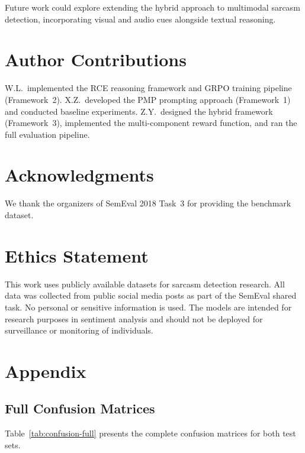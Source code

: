 \documentclass{article}
\begin{document}
Future work could explore extending the hybrid approach to multimodal sarcasm detection, incorporating visual and audio cues alongside textual reasoning.


\section*{Author Contributions}
W.L.\ implemented the RCE reasoning framework and GRPO training pipeline (Framework~2). X.Z.\ developed the PMP prompting approach (Framework~1) and conducted baseline experiments. Z.Y.\ designed the hybrid framework (Framework~3), implemented the multi-component reward function, and ran the full evaluation pipeline.

\section*{Acknowledgments}
We thank the organizers of SemEval 2018 Task~3 for providing the benchmark dataset.

\section*{Ethics Statement}
This work uses publicly available datasets for sarcasm detection research. All data was collected from public social media posts as part of the SemEval shared task. No personal or sensitive information is used. The models are intended for research purposes in sentiment analysis and should not be deployed for surveillance or monitoring of individuals.





\appendix
\section{Appendix}

\subsection{Full Confusion Matrices}

Table~\ref{tab:confusion-full} presents the complete confusion matrices for both test sets.
\end{document}
